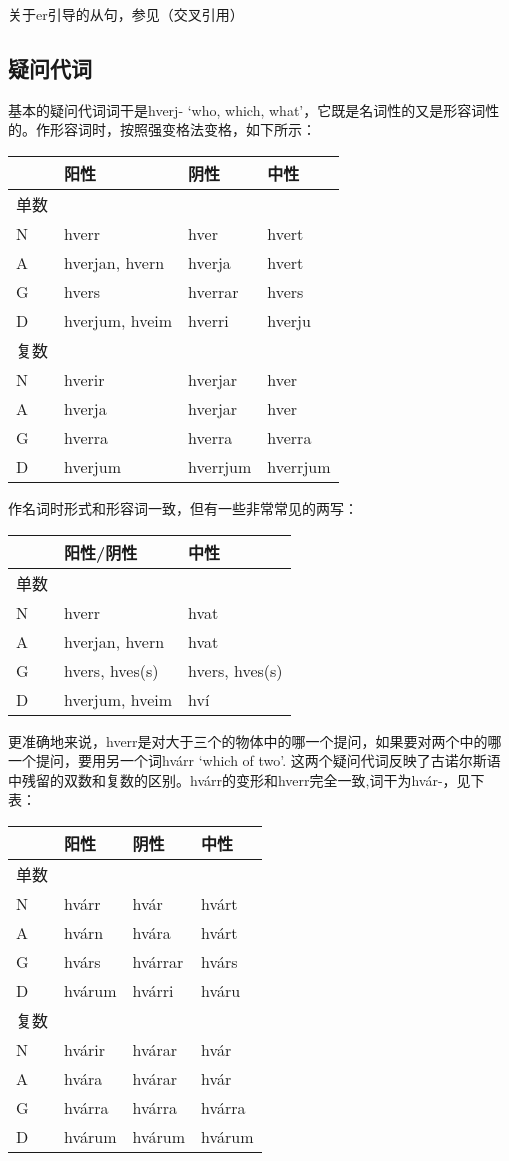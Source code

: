 关于er引导的从句，参见（交叉引用）

\subsection{疑问代词}\label{ux7591ux95eeux4ee3ux8bcd}

基本的疑问代词词干是hverj- `who, which,
what‌'，它既是名词性的又是形容词性的。作形容词时，按照强变格法变格，如下所示：

\begin{longtable}{llll}
\toprule
 & 阳性 & 阴性 & 中性 \\
\midrule
\endhead
\bottomrule
\endfoot
单数 & & & \\
N & hverr & hver & hvert \\
A & hverjan, hvern & hverja & hvert \\
G & hvers & hverrar & hvers \\
D & hverjum, hveim & hverri & hverju \\
复数 & & & \\
N & hverir & hverjar & hver \\
A & hverja & hverjar & hver \\
G & hverra & hverra & hverra \\
D & hverjum & hverrjum & hverrjum \\
\end{longtable}

作名词时形式和形容词一致，但有一些非常常见的两写：

\begin{longtable}{lll}
\toprule
 & 阳性/阴性 & 中性 \\
\midrule
\endhead
\bottomrule
\endfoot
单数 & & \\
N & hverr & hvat \\
A & hverjan, hvern & hvat \\
G & hvers, hves(s) & hvers, hves(s) \\
D & hverjum, hveim & hví \\
\end{longtable}

更准确地来说，hverr是对大于三个的物体中的哪一个提问，如果要对两个中的哪一个提问，要用另一个词hvárr
`which of two‌'.
这两个疑问代词反映了古诺尔斯语中残留的双数和复数的区别。hvárr的变形和hverr完全一致,词干为hvár-，见下表：

\begin{longtable}{llll}
\toprule
 & 阳性 & 阴性 & 中性 \\
\midrule
\endhead
\bottomrule
\endfoot
单数 & & & \\
N & hvárr & hvár & hvárt \\
A & hvárn & hvára & hvárt \\
G & hvárs & hvárrar & hvárs \\
D & hvárum & hvárri & hváru \\
复数 & & & \\
N & hvárir & hvárar & hvár \\
A & hvára & hvárar & hvár \\
G & hvárra & hvárra & hvárra \\
D & hvárum & hvárum & hvárum \\
\end{longtable}


